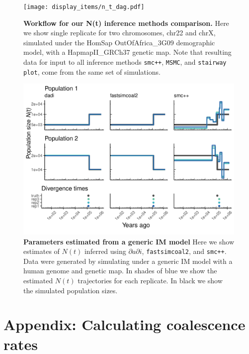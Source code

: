 \documentclass[12pt,halfline,a4paper]{ouparticle}
\newcommand{\stopsupplement}{%
        \setcounter{table}{0}
        \renewcommand{\thetable}{\arabic{table}}%
        \renewcommand{\theHtable}{X\thetable}
        \setcounter{figure}{0}
        \renewcommand{\thefigure}{\arabic{figure}}%
        \renewcommand{\theHfigure}{X\thefigure}
     }
\newcommand{\dadi}{$\partial a \partial i$\xspace}
\newcommand{\MSMC}{\texttt{MSMC}\xspace}
\newcommand{\smcpp}{\texttt{smc++}\xspace}
\newcommand{\stairwayplot}{\texttt{stairway plot}\xspace}
\begin{document}
\begin{figure}
\begin{center}
\texttt{[image: display\_items/n\_t\_dag.pdf]}
\caption{\textbf{Workflow for our N(t) inference methods comparison.}
Here we show single replicate for two chromosomes, chr22 and chrX, simulated under the HomSap
OutOfAfrica\_3G09 demographic model, with a HapmapII\_GRCh37 genetic map.
Note that resulting data for input to all inference methods \smcpp, \MSMC, and \stairwayplot,
come from the same set of simulations.}
\label{fig:n_t_dag}
\end{center}
\end{figure}


\begin{figure}
\begin{center}
\includegraphics[width=0.8\linewidth]{display_items/generic_IM.pdf}
\caption{\textbf{Parameters estimated from a generic IM model} Here we show estimates of $N(t)$
inferred using \dadi, \texttt{fastsimcoal2}, and \smcpp. Data were generated by simulating
under a generic IM model with a human genome and \cite{international2007second} genetic map.
In shades of blue we show the estimated
$N(t)$ trajectories for each replicate. In black we show the simulated population sizes.}
\label{fig:generic_IM}
\end{center}
\end{figure}



\stopsupplement

\appendix

\section*{Appendix: Calculating coalescence rates}
\end{document}
